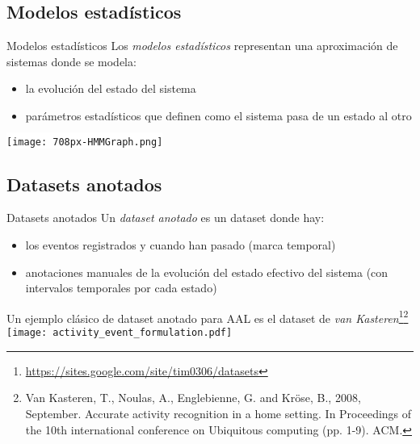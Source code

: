 \documentclass[9pt, handout]{beamer}
\begin{document}
    \subsection{Modelos estadísticos}
      \begin{frame}{Modelos estadísticos}
        Los \textit{modelos estadísticos} representan una aproximación de sistemas donde se modela:
        \begin{itemize}
          \item la evolución del estado del sistema
          \item parámetros estadísticos que definen como el sistema pasa de un estado al otro
        \end{itemize}
        \begin{center}
          \colorbox{white}{\texttt{[image: 708px-HMMGraph.png]}}
        \end{center}
      \end{frame}
    
    \subsection{Datasets anotados}
      \begin{frame}{Datasets anotados}
        Un \textit{dataset anotado} es un dataset donde hay:
        \begin{itemize}
          \item los eventos registrados y cuando han pasado (marca temporal)
          \item anotaciones manuales de la evolución del estado efectivo del sistema (con intervalos temporales por cada estado)
        \end{itemize}
        Un ejemplo clásico de dataset anotado para AAL es el dataset de \textit{van Kasteren}\footnote{\url{https://sites.google.com/site/tim0306/datasets}}\footnote{Van Kasteren, T., Noulas, A., Englebienne, G. and Kröse, B., 2008, September. Accurate activity recognition in a home setting. In Proceedings of the 10th international conference on Ubiquitous computing (pp. 1-9). ACM.}\\[1em]
        
        \texttt{[image: activity\_event\_formulation.pdf]}
      \end{frame}
    
\end{document}
